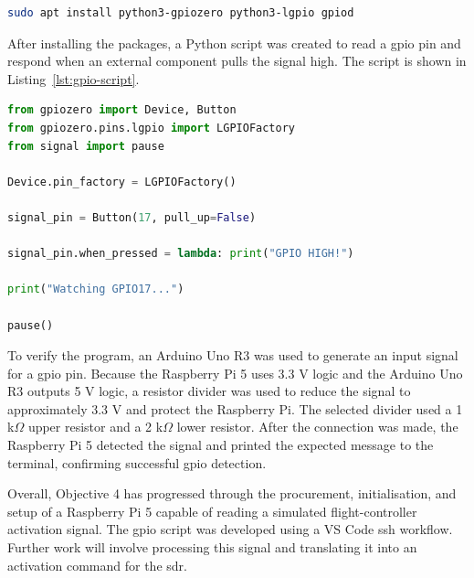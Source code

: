 \begin{lstlisting}[language=bash,caption={Bash command used to install python \gls{gpio} library.},label={lst:gpio-package-install}]
sudo apt install python3-gpiozero python3-lgpio gpiod
\end{lstlisting}

After installing the packages, a Python script was created to read a \gls{gpio} pin and respond when an external component pulls the signal high. The script is shown in Listing~\ref{lst:gpio-script}.

\begin{lstlisting}[language=python,caption={Python script used to run on the Raspberry Pi to monitor one of the \gls{gpio} pins.},label={lst:gpio-script}]
from gpiozero import Device, Button
from gpiozero.pins.lgpio import LGPIOFactory
from signal import pause

Device.pin_factory = LGPIOFactory()

signal_pin = Button(17, pull_up=False)

signal_pin.when_pressed = lambda: print("GPIO HIGH!")

print("Watching GPIO17...")

pause()
\end{lstlisting}

To verify the program, an Arduino Uno R3 was used to generate an input signal for a \gls{gpio} pin. Because the Raspberry Pi 5 uses 3.3 V logic and the Arduino Uno R3 outputs 5 V logic, a resistor divider was used to reduce the signal to approximately 3.3 V and protect the Raspberry Pi. The selected divider used a 1 k$\Omega$ upper resistor and a 2 k$\Omega$ lower resistor. After the connection was made, the Raspberry Pi 5 detected the signal and printed the expected message to the terminal, confirming successful \gls{gpio} detection.

Overall, Objective 4 has progressed through the procurement, initialisation, and setup of a Raspberry Pi 5 capable of reading a simulated flight-controller activation signal. The \gls{gpio} script was developed using a VS Code \gls{ssh} workflow. Further work will involve processing this signal and translating it into an activation command for the \gls{sdr}.
